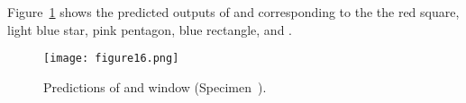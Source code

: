 Figure~\ref{fig:L3_S4_B_5HC_predictions} shows the predicted outputs of \DIFdelbegin {}\DIFdelend \DIFaddbegin {}\DIFaddend {} and \DIFdelbegin {}\DIFdelend \DIFaddbegin {}\DIFaddend {} corresponding to the \DIFdelbegin {}\DIFdelend \DIFaddbegin {}\DIFaddend the red square, light blue star, pink pentagon, blue rectangle, and \DIFdelbegin {}\DIFdelend \DIFaddbegin {}\DIFaddend .
\begin{figure}[!h]
	\centering
	\DIFdelbeginFL %
\DIFdelendFL \DIFaddbeginFL \texttt{[image: figure16.png]}
	\DIFaddendFL \caption{Predictions of \DIFdelbeginFL {}\DIFdelendFL \DIFaddbeginFL {}\DIFaddendFL {} and \DIFaddbeginFL {}\DIFaddendFL {} \DIFdelbeginFL {}\DIFdelendFL \DIFaddbeginFL {}\DIFaddendFL window \DIFdelbeginFL {}\DIFdelendFL \DIFaddbeginFL {}\DIFaddendFL (Specimen~).}
	\label{fig:L3_S4_B_5HC_predictions}
\end{figure}

